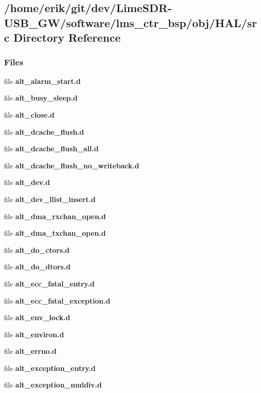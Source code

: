 \subsection{/home/erik/git/dev/\+Lime\+S\+D\+R-\/\+U\+S\+B\+\_\+\+G\+W/software/lms\+\_\+ctr\+\_\+bsp/obj/\+H\+A\+L/src Directory Reference}
\label{dir_b93c25b29dbbd65327ddfa2c0818f583}
\subsubsection*{Files}
\begin{DoxyCompactItemize}
\item 
file {\bf alt\+\_\+alarm\+\_\+start.\+d}
\item 
file {\bf alt\+\_\+busy\+\_\+sleep.\+d}
\item 
file {\bf alt\+\_\+close.\+d}
\item 
file {\bf alt\+\_\+dcache\+\_\+flush.\+d}
\item 
file {\bf alt\+\_\+dcache\+\_\+flush\+\_\+all.\+d}
\item 
file {\bf alt\+\_\+dcache\+\_\+flush\+\_\+no\+\_\+writeback.\+d}
\item 
file {\bf alt\+\_\+dev.\+d}
\item 
file {\bf alt\+\_\+dev\+\_\+llist\+\_\+insert.\+d}
\item 
file {\bf alt\+\_\+dma\+\_\+rxchan\+\_\+open.\+d}
\item 
file {\bf alt\+\_\+dma\+\_\+txchan\+\_\+open.\+d}
\item 
file {\bf alt\+\_\+do\+\_\+ctors.\+d}
\item 
file {\bf alt\+\_\+do\+\_\+dtors.\+d}
\item 
file {\bf alt\+\_\+ecc\+\_\+fatal\+\_\+entry.\+d}
\item 
file {\bf alt\+\_\+ecc\+\_\+fatal\+\_\+exception.\+d}
\item 
file {\bf alt\+\_\+env\+\_\+lock.\+d}
\item 
file {\bf alt\+\_\+environ.\+d}
\item 
file {\bf alt\+\_\+errno.\+d}
\item 
file {\bf alt\+\_\+exception\+\_\+entry.\+d}
\item 
file {\bf alt\+\_\+exception\+\_\+muldiv.\+d}
\item 

\end{DoxyCompactItemize}
